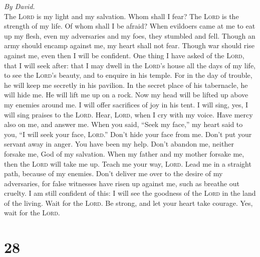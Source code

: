 \emph{By David.}\\
 The \textsc{Lord} is my light and my salvation. Whom
shall I fear? The \textsc{Lord} is the strength of my life. Of whom
shall I be afraid?  When evildoers came at me to eat up my
flesh, even my adversaries and my foes, they stumbled and fell.
 Though an army should encamp against me, my heart shall
not fear. Though war should rise against me, even then I will be
confident.  One thing I have asked of the \textsc{Lord},
that I will seek after: that I may dwell in the \textsc{Lord}'s house
all the days of my life, to see the \textsc{Lord}'s beauty, and to
enquire in his temple.  For in the day of trouble, he will
keep me secretly in his pavilion. In the secret place of his tabernacle,
he will hide me. He will lift me up on a rock.  Now my
head will be lifted up above my enemies around me. I will offer
sacrifices of joy in his tent. I will sing, yes, I will sing praises to
the \textsc{Lord}.  Hear, \textsc{Lord}, when I cry with
my voice. Have mercy also on me, and answer me.  When you
said, ``Seek my face,'' my heart said to you, ``I will seek your face,
\textsc{Lord}.''  Don't hide your face from me. Don't put
your servant away in anger. You have been my help. Don't abandon me,
neither forsake me, God of my salvation.  When my father
and my mother forsake me, then the \textsc{Lord} will take me up.
 Teach me your way, \textsc{Lord}. Lead me in a straight
path, because of my enemies.  Don't deliver me over to
the desire of my adversaries, for false witnesses have risen up against
me, such as breathe out cruelty.  I am still confident of
this: I will see the goodness of the \textsc{Lord} in the land of the
living.  Wait for the \textsc{Lord}. Be strong, and let
your heart take courage. Yes, wait for the \textsc{Lord}.

\hypertarget{section-27}{%
\section{28}\label{section-27}}

